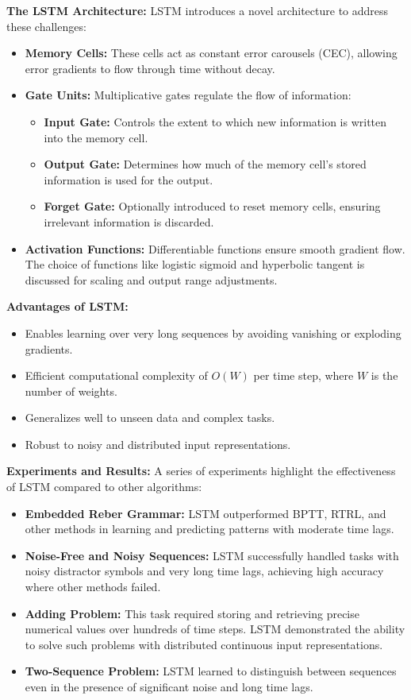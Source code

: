 \textbf{The LSTM Architecture:} LSTM introduces a novel architecture to address these challenges:
\begin{itemize}
    \item \textbf{Memory Cells:} These cells act as constant error carousels (CEC), allowing error gradients to flow through time without decay.
    \item \textbf{Gate Units:} Multiplicative gates regulate the flow of information:
    \begin{itemize}
        \item \textbf{Input Gate:} Controls the extent to which new information is written into the memory cell.
        \item \textbf{Output Gate:} Determines how much of the memory cell's stored information is used for the output.
        \item \textbf{Forget Gate:} Optionally introduced to reset memory cells, ensuring irrelevant information is discarded.
    \end{itemize}
    \item \textbf{Activation Functions:} Differentiable functions ensure smooth gradient flow. The choice of functions like logistic sigmoid and hyperbolic tangent is discussed for scaling and output range adjustments.
\end{itemize}

\textbf{Advantages of LSTM:}
\begin{itemize}
    \item Enables learning over very long sequences by avoiding vanishing or exploding gradients.
    \item Efficient computational complexity of $O(W)$ per time step, where $W$ is the number of weights.
    \item Generalizes well to unseen data and complex tasks.
    \item Robust to noisy and distributed input representations.
\end{itemize}

\textbf{Experiments and Results:} A series of experiments highlight the effectiveness of LSTM compared to other algorithms:
\begin{itemize}
    \item \textbf{Embedded Reber Grammar:} LSTM outperformed BPTT, RTRL, and other methods in learning and predicting patterns with moderate time lags.
    \item \textbf{Noise-Free and Noisy Sequences:} LSTM successfully handled tasks with noisy distractor symbols and very long time lags, achieving high accuracy where other methods failed.
    \item \textbf{Adding Problem:} This task required storing and retrieving precise numerical values over hundreds of time steps. LSTM demonstrated the ability to solve such problems with distributed continuous input representations.
    \item \textbf{Two-Sequence Problem:} LSTM learned to distinguish between sequences even in the presence of significant noise and long time lags.
\end{itemize}

